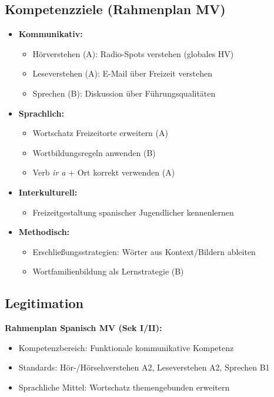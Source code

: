 \documentclass[11pt,a4paper]{article}
\begin{document}
\subsection{Kompetenzziele (Rahmenplan MV)}
\begin{itemize}
    \item \textbf{Kommunikativ:}
    \begin{itemize}
        \item Hörverstehen (A): Radio-Spots verstehen (globales HV)
        \item Leseverstehen (A): E-Mail über Freizeit verstehen
        \item Sprechen (B): Diskussion über Führungsqualitäten
    \end{itemize}
    \item \textbf{Sprachlich:}
    \begin{itemize}
        \item Wortschatz Freizeitorte erweitern (A)
        \item Wortbildungsregeln anwenden (B)
        \item Verb \textit{ir a} + Ort korrekt verwenden (A)
    \end{itemize}
    \item \textbf{Interkulturell:}
    \begin{itemize}
        \item Freizeitgestaltung spanischer Jugendlicher kennenlernen
    \end{itemize}
    \item \textbf{Methodisch:}
    \begin{itemize}
        \item Erschließungsstrategien: Wörter aus Kontext/Bildern ableiten
        \item Wortfamilienbildung als Lernstrategie (B)
    \end{itemize}
\end{itemize}

\subsection{Legitimation}
\textbf{Rahmenplan Spanisch MV (Sek I/II):}
\begin{itemize}
    \item Kompetenzbereich: Funktionale kommunikative Kompetenz
    \item Standards: Hör-/Hörsehverstehen A2, Leseverstehen A2, Sprechen B1
    \item Sprachliche Mittel: Wortschatz themengebunden erweitern
\end{itemize}
\end{document}
